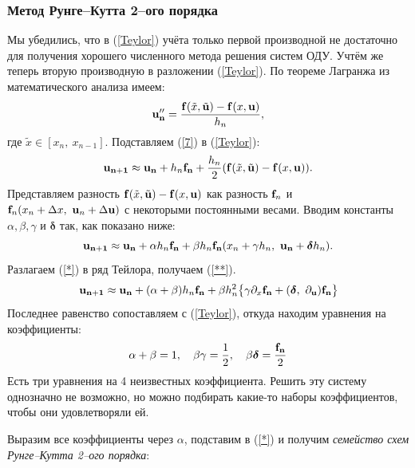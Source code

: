 \documentclass[a4paper,9pt,russian]{article}
\begin{document}
\subsubsection{Метод Рунге--Кутта 2--ого порядка}
    Мы убедились, что в (\ref{Teylor}) учёта только первой производной не достаточно для получения хорошего численного метода решения систем ОДУ. Учтём же теперь вторую производную в разложении (\ref{Teylor}). По теореме Лагранжа \cite{wiki_l} из математического анализа имеем:
    \begin{equation}\label{7}
        {\bf u_{n}''} = \frac{{\bf f}(\tilde x, \tilde {\bf u}) - {\bf f}( x, {\bf u})}{h_n},
    \end{equation}
    где $\tilde x \in[ x_n,\ x_{n-1}]$. Подставляем (\ref{7}) в (\ref{Teylor}):
    \begin{equation*}
     {\bf u_{n+1}} \approx {\bf u_{n}} + h_n{\bf f_n}     +
    \frac{h_n}{2}({\bf f}(\tilde x, \tilde {\bf u}) - {\bf f}( x, {\bf u})).
    \end{equation*}  
    Представляем разность ${\bf f}(\tilde x, \tilde {\bf u}) - {\bf f}( x, {\bf u})$ как разность ${\bf f}_n$ и ${\bf f}_n(x_n + \Delta x,\  {\bf u}_n + \Delta  {\bf u})$ с некоторыми постоянными весами. Вводим константы $\alpha, \beta, \gamma$ и $\boldsymbol{\delta}$ так, как показано ниже:    
    \begin{equation}\label{*}
        {\bf u_{n+1}} \approx {\bf u_{n}} + \alpha h_n {\bf f_{n}} + \beta {h_n} {\bf f_{n}}(x_n+\gamma h_n,\ {\bf u_{n}} + \boldsymbol{\delta} h_n).
    \end{equation}
    Разлагаем (\ref{*}) в ряд Тейлора, получаем (\ref{**}). 
    \begin{equation}\label{**}
        {\bf u_{n+1}} \approx {\bf u_{n}} + (\alpha + \beta) h_n {\bf f_{n}} + \beta h_n^2 \bigl\{ \gamma \partial_x {\bf f_n} + (\boldsymbol{\delta},\ \partial_{\bf u}) {\bf f_n} \bigr\}
    \end{equation}
    Последнее равенство сопоставляем с (\ref{Teylor}), откуда находим уравнения на коэффициенты:
    \[
        \alpha + \beta = 1,\quad \beta \gamma = \frac12,\quad \beta \boldsymbol{\delta} = \frac{\bf f_n}2
    \]
    Есть три уравнения на 4 неизвестных коэффициента. Решить эту систему однозначно не возможно, но можно подбирать какие-то наборы коэффициентов, чтобы они удовлетворяли ей. \par
    Выразим все коэффициенты через $\alpha$, подставим в (\ref{*}) и получим {\it семейство схем Рунге--Кутта 2--ого порядка}:
    
\end{document}
